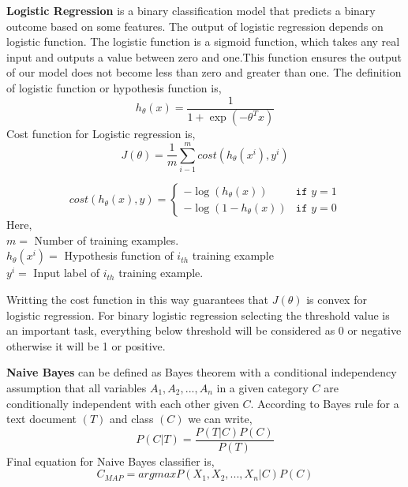\textbf{Logistic Regression}\cite{sharma2015active} is a binary classification model that predicts a binary outcome based on some features. The output of logistic regression depends on logistic function. The logistic function is a sigmoid function, which takes any real input and outputs a value between zero and one.This function ensures the output of our model does not become less than zero and greater than one. The definition of logistic function or hypothesis function is,
\begin{equation}
    h_{\theta}(x) =  \frac{1}{1+\exp({-\theta^T x})}
\end{equation}
Cost function for Logistic regression is,
\begin{equation}
    J(\theta) = \frac{1}{m}\sum_{i-1}^{m}cost(h_{\theta}(x^{i}),y^{i})   
\end{equation}

\[
cost(h_{\theta}(x), y) = 
\begin{cases}
    -\log (h_{\theta}(x)) & \texttt{if } y = 1\\
     -\log (1-h_{\theta}(x)) & \texttt{if } y = 0
\end{cases}
\]
Here,\\
$m = $ Number of training examples.\\
$h_{\theta}(x^{i}) = $ Hypothesis function of $i_{th}$ training example\\
$y^i = $ Input label of $i_{th}$ training example.
\vspace{0.2cm}

\noindent
Writting the cost function in this way guarantees that $J(\theta)$ is convex for logistic regression.
For binary logistic regression selecting
the threshold value is an important task, everything below threshold will be considered as 0 or negative otherwise it will be 1 or positive.


\vspace{0.3cm}
\textbf{Naive Bayes}\cite{yoo2015classification} can be defined as Bayes theorem with a conditional independency assumption that all variables $A_{1},A_{2},...,A_{n}$ in a given category $C$ are conditionally independent with each other given $C$. 
According to Bayes rule for a text document $(T)$ and class $(C)$ we can write,
\begin{equation}
    P(C|T) = \frac{P(T|C)P(C)}{P(T)}
\end{equation}
Final equation for Naive Bayes classifier is,
\begin{equation}
     C_{MAP} = argmax P(X_{1},X_{2},...,X_{n}|C)P(C)
\end{equation}

